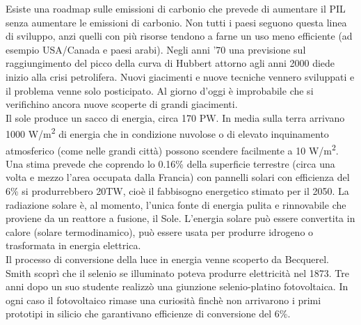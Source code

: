 \documentclass{article}
\numberwithin{figure}{section}
\numberwithin{equation}{section}
\begin{document}
Esiste una roadmap sulle emissioni di carbonio che prevede di aumentare il PIL senza aumentare le emissioni di carbonio. Non tutti i paesi seguono questa linea di sviluppo, anzi quelli con più risorse tendono a farne un uso meno efficiente (ad esempio USA/Canada e paesi arabi).
Negli anni '70 una previsione sul raggiungimento del picco della curva di Hubbert attorno agli anni 2000 diede inizio alla crisi petrolifera. Nuovi giacimenti e nuove tecniche vennero sviluppati e il problema venne solo posticipato. Al giorno d'oggi è improbabile che si verifichino ancora nuove scoperte di grandi giacimenti.\\

Il sole produce un sacco di energia, circa 170 PW. In media sulla terra arrivano 1000 W/m\textsuperscript{2} di energia che in condizione nuvolose o di elevato inquinamento atmosferico (come nelle grandi città) possono scendere facilmente a 10 W/m\textsuperscript{2}. Una stima prevede che coprendo lo 0.16\% della superficie terrestre (circa una volta e mezzo l'area occupata dalla Francia) con pannelli solari con efficienza del 6\% si produrrebbero 20TW, cioè il fabbisogno energetico stimato per il 2050.
La radiazione solare è, al momento, l'unica fonte di energia pulita e rinnovabile che proviene da un reattore a fusione, il Sole. L'energia solare può essere convertita in calore (solare termodinamico), può essere usata per produrre idrogeno o trasformata in energia elettrica.\\

Il processo di conversione della luce in energia venne scoperto da Becquerel. Smith scoprì che il selenio se illuminato poteva produrre elettricità nel 1873. Tre anni dopo un suo studente realizzò una giunzione selenio-platino fotovoltaica. In ogni caso il fotovoltaico rimase una curiosità finchè non arrivarono i primi prototipi in silicio che garantivano efficienze di conversione del 6\%.
\end{document}
